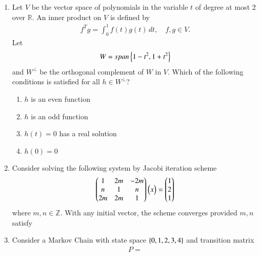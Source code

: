 \begin{enumerate}[label=\thesection.\arabic*.,ref=\thesection.\theenumi]
\item Let $V$ be the vector space of polynomials in the variable $t$ of degree at most 2 over $\mathbb{R}$.  An inner product on $V$ is defined by
\begin{align}
f^Tg = \int_{0}^{1}f(t)g(t)\,dt, \quad f,g \in V.
\end{align}
Let
\begin{align}
W = span\left\{1-t^2,1+t^2\right\}
\end{align}
and $W^{\perp}$  be the orthogonal complement of $W$ in $V$.  Which of the following conditions is satisfied for all $h \in W^{\perp}$?
\begin{enumerate}
\item $h$ is an even function
\item $h$ is an odd function
\item $h(t) =0$ has a real solution
\item $h(0) = 0$
\end{enumerate}
\item Consider solving the following system by Jacobi iteration scheme
\begin{align}
\begin{pmatrix}
1 & 2m & -2m \\
n & 1 & n \\
2m & 2m & 1
\end{pmatrix}
\begin{pmatrix}x\end{pmatrix}
= \begin{pmatrix} 1 \\ 2 \\1\end{pmatrix}
\end{align}
where $m,n \in \mathbb{Z}$.  With any initial vector, the scheme converges provided $m,n$ satisfy
\begin{enumerate}
\end{enumerate}
\item Consider a Markov Chain with state space $\left\{0,1,2,3,4\right\}$ and transition matrix
\begin{align}
P = 

\end{align}
\end{enumerate}
